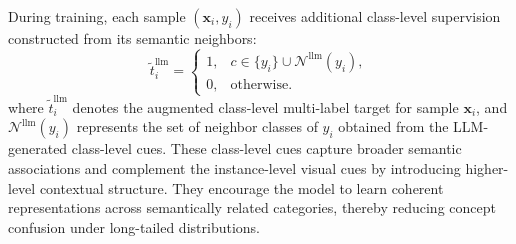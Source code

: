 During training, each sample $(\mathbf{x}_i, y_i)$ receives additional class-level supervision constructed from its semantic neighbors:
\begin{equation}
\tilde{t}^{\text{llm}}_{i} =
\begin{cases}
1, & c \in \{y_i\} \cup \mathcal{N}^{\text{llm}}(y_i), \\
0, & \text{otherwise.}
\end{cases}
\end{equation}
where $\tilde{t}^{\text{llm}}_{i}$ denotes the augmented class-level multi-label target for sample $\mathbf{x}_i$, 
and $\mathcal{N}^{\text{llm}}(y_i)$ represents the set of neighbor classes of $y_i$ 
obtained from the LLM-generated class-level cues. These class-level cues capture broader semantic associations and complement the instance-level visual cues by introducing higher-level contextual structure.
They encourage the model to learn coherent representations across semantically related categories, thereby reducing concept confusion under long-tailed distributions.



